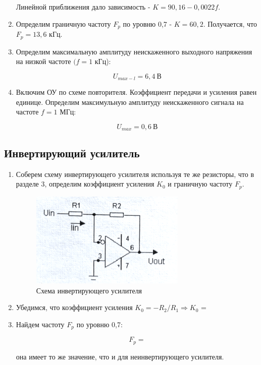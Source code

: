 \documentclass[a4paper, 12pt]{article}%
\begin{document}
\begin{enumerate}
Линейной приближения дало зависимость - $K = 90,16 - 0,0022f$.

\item Определим граничную частоту $F_p$ по уровню 0,7 - $K = 60,2$. Получается, что $F_p = 13,6$ кГц.

\item Определим максимальную амплитуду неискаженного выходного напряжения на низкой частоте $(f = 1$ кГц):

\[U_{max-l} = 6,4 \: \text{В}\]

\item Включим ОУ по схеме повторителя. Коэффициент передачи и усиления равен единице. Определим максимульную амплитуду неискаженного сигнала на частоте $f = 1$ МГц:

\[U_{max} = 0,6 \: \text{В}\]

\end{enumerate}

\newpage
\subsection{Инвертирующий усилитель}

\begin{enumerate}

\item Соберем схему инвертирующего усилителя используя те же резисторы, что в разделе 3, определим коэффициент усиления $K_0$ и граничную частоту $F_p$.

\begin{figure}[h]
\begin{center}
\includegraphics[width = 0.7\textwidth]{scheme3.png}
\caption{Схема инвертирующего усилителя}
\end{center}
\end{figure}

\item Убедимся, что коэффициент усиления $K_0 = -R_2 / R_1 \Rightarrow K_0$ =                     
\item Найдем частоту $F_p$ по уровню 0,7:

\[F_p =                          \]

она имеет то же значение, что и для неинвертирующего усилителя.

\end{enumerate}
\end{document}
